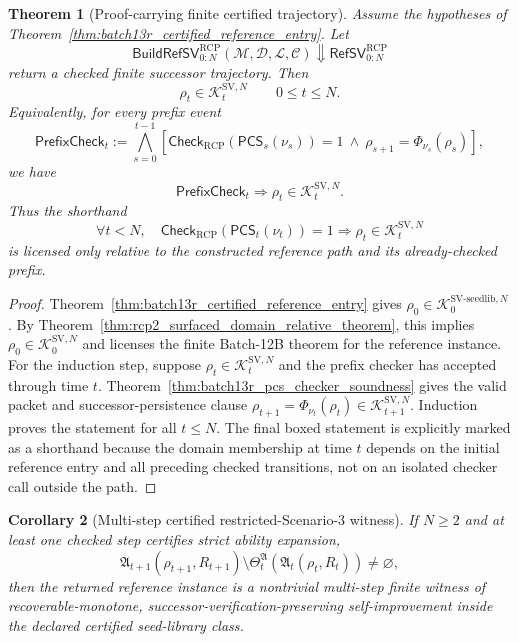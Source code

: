 \documentclass[11pt]{article}
\newtheorem{theorem}{Theorem}[section]
\newtheorem{corollary}[theorem]{Corollary}
\newcommand{\1}{\mathbf{1}}
\newcommand{\RCP}{\mathrm{RCP}}
\providecommand{\Kcal}{\mathcal{K}}
\begin{document}
\begin{theorem}[Proof-carrying finite certified trajectory]
\label{thm:batch13r_proof_carrying_finite_trajectory}
Assume the hypotheses of Theorem~\ref{thm:batch13r_certified_reference_entry}.  Let
\[
\mathsf{BuildRefSV}_{0:N}^{\RCP}(\mathcal M,\mathcal D,\mathcal L,\mathcal C)
\Downarrow
\mathsf{RefSV}_{0:N}^{\RCP}
\]
return a checked finite successor trajectory.  Then
\[
\rho_t\in\Kcal_t^{\mathrm{SV},N}
\qquad
0\le t\le N.
\]
Equivalently, for every prefix event
\[
\mathsf{PrefixCheck}_t:=
\bigwedge_{s=0}^{t-1}
\left[\mathsf{Check}_{\RCP}(\mathsf{PCS}_s(\nu_s))=1
\ \wedge\ \rho_{s+1}=\Phi_{\nu_s}(\rho_s)\right],
\]
we have
\[
\boxed{
\mathsf{PrefixCheck}_t\Longrightarrow \rho_t\in\Kcal_t^{\mathrm{SV},N}.
}
\]
Thus the shorthand
\[
\boxed{
\forall t<N,\quad
\mathsf{Check}_{\RCP}(\mathsf{PCS}_t(\nu_t))=1
\Longrightarrow
\rho_t\in\Kcal_t^{\mathrm{SV},N}
}
\]
is licensed only relative to the constructed reference path and its already-checked prefix.
\end{theorem}

\begin{proof}
Theorem~\ref{thm:batch13r_certified_reference_entry} gives \(\rho_0\in\Kcal_0^{\mathrm{SV\mbox{-}seedlib},N}\).  By Theorem~\ref{thm:rcp2_surfaced_domain_relative_theorem}, this implies \(\rho_0\in\Kcal_0^{\mathrm{SV},N}\) and licenses the finite Batch-12B theorem for the reference instance.  For the induction step, suppose \(\rho_t\in\Kcal_t^{\mathrm{SV},N}\) and the prefix checker has accepted through time \(t\).  Theorem~\ref{thm:batch13r_pcs_checker_soundness} gives the valid packet and successor-persistence clause \(\rho_{t+1}=\Phi_{\nu_t}(\rho_t)\in\Kcal_{t+1}^{\mathrm{SV},N}\).  Induction proves the statement for all \(t\le N\).  The final boxed statement is explicitly marked as a shorthand because the domain membership at time \(t\) depends on the initial reference entry and all preceding checked transitions, not on an isolated checker call outside the path.
\end{proof}

\begin{corollary}[Multi-step certified restricted-Scenario-3 witness]
\label{cor:batch13r_multistep_restricted_scenario3_witness}
If \(N\ge2\) and at least one checked step certifies strict ability expansion,
\[
\mathfrak A_{t+1}(\rho_{t+1},R_{t+1})
\setminus
\Theta_t^{\mathfrak A}(\mathfrak A_t(\rho_t,R_t))
\ne\varnothing,
\]
then the returned reference instance is a nontrivial multi-step finite witness of recoverable-monotone, successor-verification-preserving self-improvement inside the declared certified seed-library class.
\end{corollary}
\end{document}
